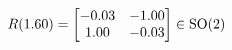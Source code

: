 \documentclass[preview]{standalone}
\begin{document}
\begin{align*}
\special{dvisvgm:raw <g id='unique000'>}R(1.60) = \begin{bmatrix} -0.03 & -1.00 \\ 1.00 & -0.03 \end{bmatrix} \in \text{SO}(2)\special{dvisvgm:raw </g>}
\end{align*}
\end{document}
